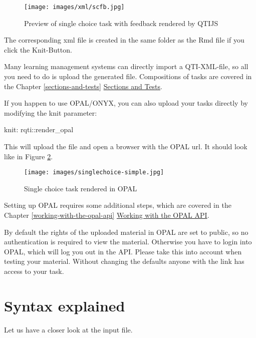 \documentclass[twoside]{tufte-book}
\newenvironment{Shaded}{}{}
\newcommand{\NormalTok}[1]{#1}
\newcommand{\SpecialCharTok}[1]{\textcolor[rgb]{0.25,0.44,0.63}{#1}}
\begin{document}
\begin{figure}
\centering
\texttt{[image: images/xml/scfb.jpg]}
\caption{\label{sc1qtijs}Preview of single choice task with feedback rendered by QTIJS}
\end{figure}

The corresponding xml file is created in the same folder as the Rmd file if you click the Knit-Button.

Many learning management systems can directly import a QTI-XML-file, so all you need to do is upload the generated file. Compositions of tasks are covered in the Chapter \ref{sections-and-tests} \href{section.html}{Sections and Tests}.

If you happen to use OPAL/ONYX, you can also upload your tasks directly by modifying the knit parameter:

\begin{Shaded}
\begin{Highlighting}[]
\NormalTok{knit}\SpecialCharTok{:}\NormalTok{ rqti}\SpecialCharTok{::}\NormalTok{render\_opal}
\end{Highlighting}
\end{Shaded}

This will upload the file and open a browser with the OPAL url. It should look like in Figure \ref{sc1opal}.

\begin{figure}
\centering
\texttt{[image: images/singlechoice-simple.jpg]}
\caption{\label{sc1opal}Single choice task rendered in OPAL}
\end{figure}

Setting up OPAL requires some additional steps, which are covered in the Chapter \ref{working-with-the-opal-api} \href{api_opal.html}{Working with the OPAL API}.

By default the rights of the uploaded material in OPAL are set to public, so no authentication is required to view the material. Otherwise you have to login into OPAL, which will log you out in the API. Please take this into account when testing your material. Without changing the defaults anyone with the link has access to your task.

\section{Syntax explained}\label{syntax-explained}

Let us have a closer look at the input file.
\end{document}

